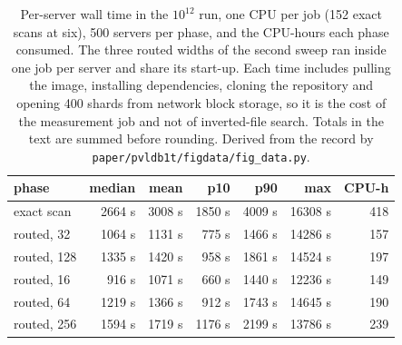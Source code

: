 \documentclass[sigconf, nonacm]{acmart}
\begin{document}
\begin{table}[t]
\caption{Per-server wall time in the $10^{12}$ run, one CPU per job (152 exact scans at six), 500 servers per phase, and
the CPU-hours each phase consumed. The three routed widths of the second sweep ran inside one
job per server and share its start-up. Each time includes pulling the image, installing
dependencies, cloning the repository and opening 400 shards from network block storage, so it is
the cost of the measurement job and not of inverted-file search. Totals in the text are summed
before rounding. Derived from the record by \texttt{paper/pvldb1t/figdata/fig\_data.py}.}
\label{tab:cost}
\centering
\small
\begin{tabular}{lrrrrrr}
\toprule
phase & median & mean & p10 & p90 & max & CPU-h \\
\midrule
exact scan       & 2664 s & 3008 s & 1850 s & 4009 s & 16308 s & 418 \\
routed, 32       & 1064 s & 1131 s &  775 s & 1466 s & 14286 s & 157 \\
routed, 128      & 1335 s & 1420 s &  958 s & 1861 s & 14524 s & 197 \\
routed, 16       &  916 s & 1071 s &  660 s & 1440 s & 12236 s & 149 \\
routed, 64       & 1219 s & 1366 s &  912 s & 1743 s & 14645 s & 190 \\
routed, 256      & 1594 s & 1719 s & 1176 s & 2199 s & 13786 s & 239 \\
\bottomrule
\end{tabular}
\end{table}
\end{document}
